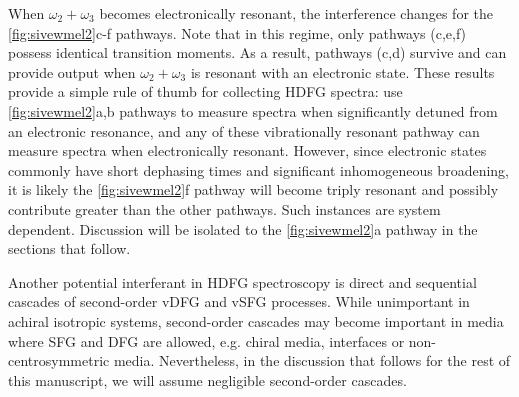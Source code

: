\documentclass[aip, jcp, reprint, onecolumn, nofootinbib]{revtex4-2}
\begin{document}
When $\omega_2 + \omega_3$ becomes electronically resonant, the interference changes for the \autoref{fig:sivewmel2}c-f pathways.
Note that in this regime, only pathways (c,e,f) possess identical transition moments.
As a result, pathways (c,d) survive and can provide output when $\omega_2+\omega_3$ is resonant with an electronic state. 
These results provide a simple rule of thumb for collecting HDFG spectra: use \autoref{fig:sivewmel2}a,b pathways to measure spectra when significantly detuned from an electronic resonance, and any of these vibrationally resonant pathway can measure spectra when electronically resonant.
However, since electronic states commonly have short dephasing times and significant inhomogeneous broadening,\cite{Dong2015, Lewis2015} it is likely the \autoref{fig:sivewmel2}f pathway will become triply resonant and possibly contribute greater than the other pathways. 
Such instances are system dependent. 
Discussion will be isolated to the \autoref{fig:sivewmel2}a pathway in the sections that follow.

Another potential interferant in HDFG spectroscopy is direct and sequential cascades of second-order vDFG and vSFG processes.\cite{RN297, RN301}
While unimportant in achiral isotropic systems,\cite{Belkin2000} second-order cascades may become important in media where SFG and DFG are allowed, e.g. chiral media, interfaces or non-centrosymmetric media. 
Nevertheless, in the discussion that follows for the rest of this manuscript, we will assume negligible second-order cascades. 
\end{document}
